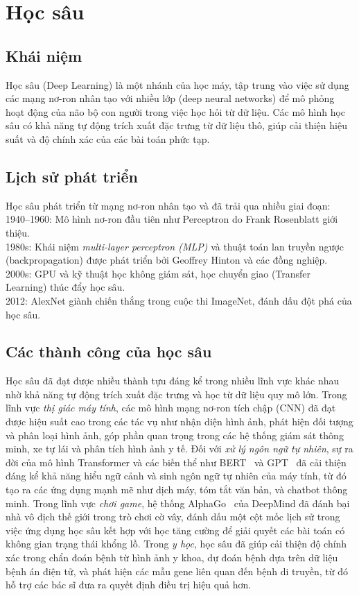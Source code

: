 \documentclass[12pt]{report}
\begin{document}
\section{Học sâu}

\subsection{Khái niệm}

Học sâu (Deep Learning) là một nhánh của học máy, tập trung vào việc sử dụng các mạng nơ-ron nhân tạo với nhiều lớp (deep neural networks) để mô phỏng hoạt động của não bộ con người trong việc học hỏi từ dữ liệu. Các mô hình học sâu có khả năng tự động trích xuất đặc trưng từ dữ liệu thô, giúp cải thiện hiệu suất và độ chính xác của các bài toán phức tạp.

\subsection{Lịch sử phát triển}

Học sâu phát triển từ mạng nơ-ron nhân tạo và đã trải qua nhiều giai đoạn:\\
1940–1960: Mô hình nơ-ron đầu tiên như Perceptron do Frank Rosenblatt giới thiệu.\\
1980s: Khái niệm \textit{multi-layer perceptron (MLP)} và thuật toán lan truyền ngược (backpropagation) được phát triển bởi Geoffrey Hinton và các đồng nghiệp.\\
2000s: GPU và kỹ thuật học không giám sát, học chuyển giao (Transfer Learning) thúc đẩy học sâu.\\
2012: AlexNet giành chiến thắng trong cuộc thi ImageNet, đánh dấu đột phá của học sâu.

\subsection{Các thành công của học sâu}

Học sâu đã đạt được nhiều thành tựu đáng kể trong nhiều lĩnh vực khác nhau nhờ khả năng tự động trích xuất đặc trưng và học từ dữ liệu quy mô lớn. Trong lĩnh vực \textit{thị giác máy tính}, các mô hình mạng nơ-ron tích chập (CNN) đã đạt được hiệu suất cao trong các tác vụ như nhận diện hình ảnh, phát hiện đối tượng và phân loại hình ảnh, góp phần quan trọng trong các hệ thống giám sát thông minh, xe tự lái và phân tích hình ảnh y tế. Đối với \textit{xử lý ngôn ngữ tự nhiên}, sự ra đời của mô hình Transformer và các biến thể như BERT~\cite{bert} và GPT~\cite{gpt} đã cải thiện đáng kể khả năng hiểu ngữ cảnh và sinh ngôn ngữ tự nhiên của máy tính, từ đó tạo ra các ứng dụng mạnh mẽ như dịch máy, tóm tắt văn bản, và chatbot thông minh. Trong lĩnh vực \textit{chơi game}, hệ thống AlphaGo~\cite{alphago} của DeepMind đã đánh bại nhà vô địch thế giới trong trò chơi cờ vây, đánh dấu một cột mốc lịch sử trong việc ứng dụng học sâu kết hợp với học tăng cường để giải quyết các bài toán có không gian trạng thái khổng lồ. Trong \textit{y học}, học sâu đã giúp cải thiện độ chính xác trong chẩn đoán bệnh từ hình ảnh y khoa, dự đoán bệnh dựa trên dữ liệu bệnh án điện tử, và phát hiện các mẫu gene liên quan đến bệnh di truyền, từ đó hỗ trợ các bác sĩ đưa ra quyết định điều trị hiệu quả hơn.
\end{document}
